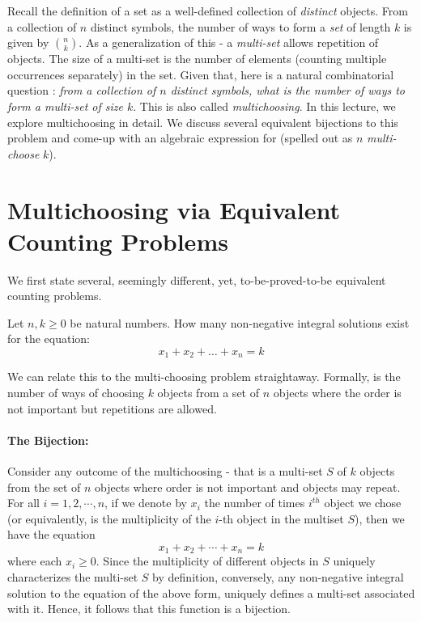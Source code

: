 
Recall the definition of a set as a well-defined collection of \emph{distinct} objects. From a collection of $n$ distinct symbols, the number of ways to form a \emph{set} of length $k$ is given by $\binom{n}{k}$. As a generalization of this - a \emph{multi-set} allows repetition of objects. The size of a multi-set is the number of elements (counting multiple occurrences separately) in the set. Given that, here is a natural combinatorial question : \textit{from a collection of $n$ distinct symbols, what is the number of ways to form a \emph{multi-set} of size $k$}. This is also called {\em multichoosing}. In this lecture, we explore multichoosing in detail. We discuss several equivalent bijections to this problem and come-up with an algebraic expression for  (spelled out as $n$ \emph{multi-choose} $k$).

\section{Multichoosing via Equivalent Counting Problems} \label{sec:equi-bij}

We first state several, seemingly different, yet, to-be-proved-to-be equivalent counting problems.



\begin{problem}
\label{non-neq-sol-prob}
Let $n,k \ge 0$ be natural numbers. How many non-negative integral solutions exist for the equation:
$$x_1+x_2+ \ldots + x_n = k$$
\end{problem}

We can relate this to the multi-choosing problem straightaway.
Formally,  is the number of ways of choosing $k$ objects from a set of $n$ objects where the order is not important but repetitions are allowed. 

\paragraph{The Bijection:}
Consider any outcome of the multichoosing - that is a multi-set $S$ of $k$ objects from the set of $n$ objects where order is not important and objects may repeat. 
For all $i=1,2,\cdots,n$, if we denote by $x_i$ the number of times $i^{th}$ object we chose (or equivalently, is the multiplicity of the $i$-th object in the multiset $S$), then we have the equation \begin{equation}\label{eqn1}
    x_1+x_2+\cdots+x_n=k
\end{equation} where each $x_i \geq 0$.
Since the multiplicity of different objects in $S$ uniquely characterizes the multi-set $S$ by definition, conversely, any non-negative integral solution to the equation of the above form, uniquely defines a multi-set associated with it. Hence, it follows that this function is a bijection.

